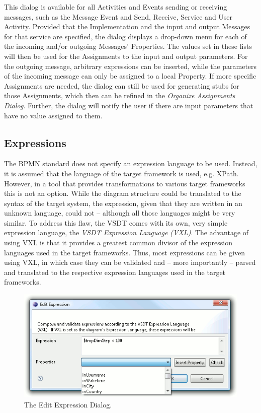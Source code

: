 This dialog is available for all Activities and Events sending or receiving
messages, such as the Message Event and Send, Receive, Service and User Activity.
Provided that the Implementation and the input and output Messages for that
service are specified, the dialog displays a drop-down menu for each of the
incoming and/or outgoing Messages' Properties.  The values set in these lists
will then be used for the Assignments to the input and output parameters.  For
the outgoing message, arbitrary expressions can be inserted, while the parameters
of the incoming message can only be assigned to a local Property.  If more specific
Assignments are needed, the dialog can still be used for generating stubs for
those Assignments, which then can be refined in the \emph{Organize Assignments
Dialog}.  Further, the dialog will notify the user if there are input parameters
that have no value assigned to them.



\subsection{Expressions}
\label{sec:user_features_exp}

The BPMN standard does not specify an expression language to be used.  Instead,
it is assumed that the language of the target framework is used, e.g.  XPath.
However, in a tool that provides transformations to various target frameworks
this is not an option.  While the diagram structure could be translated to the
syntax of the target system, the expression, given that they are written in an
unknown language, could not -- although all those languages might be very similar.
To address this flaw, the VSDT comes with its own, very simple expression language,
the \emph{VSDT Expression Language (VXL)}.  The advantage of using VXL is that it
provides a greatest common divisor of the expression languages used in the target
frameworks.  Thus, most expressions can be given using VXL, in which case they
can be validated and -- more importantly -- parsed and translated to the
respective expression languages used in the target frameworks.

\begin{figure}[ht]
	\centering
	\includegraphics[width=.5\textwidth]{figures/features/editExp.png}
	\caption{The Edit Expression Dialog.}
	\label{fig:editExp}
\end{figure}

